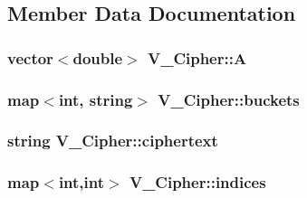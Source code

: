 \subsection{Member Data Documentation}
\subsubsection[{\texorpdfstring{A}{A}}]{\setlength{\rightskip}{0pt plus 5cm}vector$<$double$>$ V\+\_\+\+Cipher\+::A\hspace{0.3cm}{\ttfamily [private]}}\hypertarget{classV__Cipher_abe2dc57a84ce049dbc372becec23ac93}{}\label{classV__Cipher_abe2dc57a84ce049dbc372becec23ac93}
\subsubsection[{\texorpdfstring{buckets}{buckets}}]{\setlength{\rightskip}{0pt plus 5cm}map$<$int, string$>$ V\+\_\+\+Cipher\+::buckets\hspace{0.3cm}{\ttfamily [private]}}\hypertarget{classV__Cipher_aa81441e1323df571461197536d49268d}{}\label{classV__Cipher_aa81441e1323df571461197536d49268d}
\subsubsection[{\texorpdfstring{ciphertext}{ciphertext}}]{\setlength{\rightskip}{0pt plus 5cm}string V\+\_\+\+Cipher\+::ciphertext\hspace{0.3cm}{\ttfamily [private]}}\hypertarget{classV__Cipher_a957196ebb3d63de74d98aa055c16af52}{}\label{classV__Cipher_a957196ebb3d63de74d98aa055c16af52}
\subsubsection[{\texorpdfstring{indices}{indices}}]{\setlength{\rightskip}{0pt plus 5cm}map$<$int,int$>$ V\+\_\+\+Cipher\+::indices\hspace{0.3cm}{\ttfamily [private]}}\hypertarget{classV__Cipher_a7cbe0067ee10f26519ee8796fcce1ee7}{}\label{classV__Cipher_a7cbe0067ee10f26519ee8796fcce1ee7}
